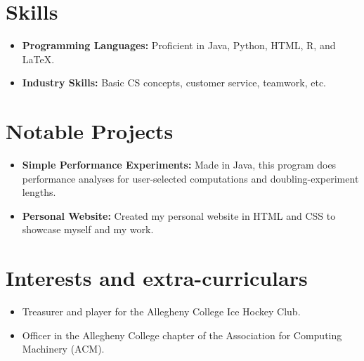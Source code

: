 \documentclass[11pt,a4paper,sans]{moderncv}
\begin{document}
\section{Skills}

\vspace{3pt}

\begin{itemize} %
\item \textbf{Programming Languages:} Proficient in Java, Python, HTML, R, and LaTeX.
\vspace{6pt}
\item \textbf{Industry Skills:} Basic CS concepts, customer service, teamwork, etc.
\end{itemize} %


\section{Notable Projects}

\vspace{3pt}

\begin{itemize} %
\item \textbf{Simple Performance Experiments:} Made in Java, this program does performance analyses for user-selected computations and doubling-experiment lengths.
\item \textbf{Personal Website:} Created my personal website in HTML and CSS to showcase myself and my work.
\end{itemize} %


\section{Interests and extra-curriculars}
\vspace{3pt}

\begin{itemize} %
\item{Treasurer and player for the Allegheny College Ice Hockey Club.}
\item{Officer in the Allegheny College chapter of the Association for Computing Machinery (ACM).}
\end{itemize} %
\end{document}
